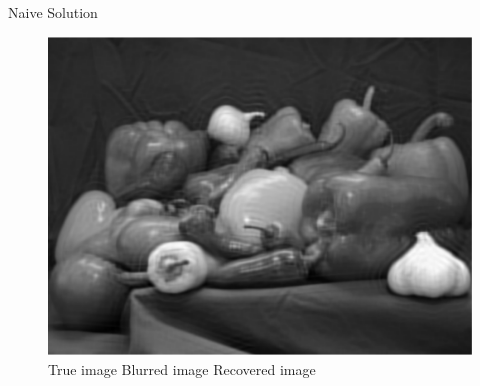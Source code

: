 \documentclass[12pt]{beamer}
\begin{document}
\begin{frame}{Naive Solution}
\begin{figure}
\includegraphics[scale=0.2]{fig3} \\
\small{\hspace{1em} True image \hspace{4em} Blurred image \hspace{3em} Recovered image}
\end{figure}
\end{frame}
\end{document}
